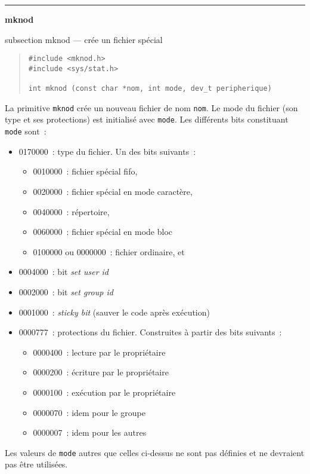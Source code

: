 \documentclass [twoside] {report}
\newcommand {\primitive} [1]
    {
	\phantomsection
	{\large \bf #1}
	\addcontentsline {toc} {subsection} {#1}
    }
\newcommand {\separation}
    {
	\vspace {5mm}
	\nopagebreak
	\hrule
    }
\begin{document}
\separation
\primitive {mknod} --- crée un fichier spécial

\begin {quote}
\begin {verbatim}
#include <mknod.h>
#include <sys/stat.h>

int mknod (const char *nom, int mode, dev_t peripherique)
\end{verbatim}
\end {quote}

La primitive {\tt mknod} crée un nouveau fichier de
nom {\tt nom}. Le mode du fichier (son type et ses
protections) est initialisé avec {\tt mode}. Les
différents bits constituant {\tt mode} sont~:

\begin {itemize}
    \item 0170000~: type du fichier. Un des bits suivants~:
	\begin {itemize}
	    \item 0010000~: fichier spécial fifo,
	    \item 0020000~: fichier spécial en mode caractère,
	    \item 0040000~: répertoire,
	    \item 0060000~: fichier spécial en mode bloc
	    \item 0100000 ou 0000000~: fichier ordinaire, et
	\end {itemize}
    \item 0004000~: bit {\it set user id}
    \item 0002000~: bit {\it set group id}
    \item 0001000~: {\it sticky bit} (sauver le code après exécution)
    \item 0000777~: protections du fichier. Construites
	à partir des bits suivants~:
	\begin {itemize}
	    \item 0000400~: lecture par le propriétaire
	    \item 0000200~: écriture par le propriétaire
	    \item 0000100~: exécution par le propriétaire
	    \item 0000070~: idem pour le groupe
	    \item 0000007~: idem pour les autres
	\end {itemize}
\end {itemize}

Les valeurs de {\tt mode} autres que celles
ci-dessus ne sont pas définies et ne devraient pas
être utilisées.
\end{document}
